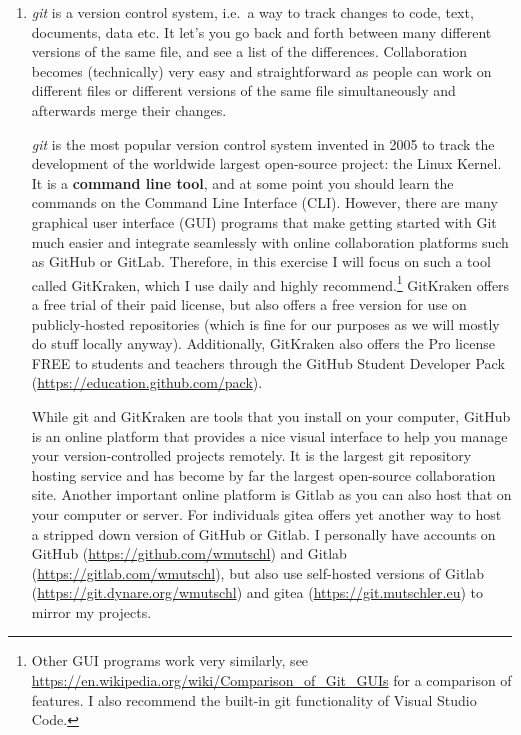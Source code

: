 \begin{enumerate}

\item
\emph{git} is a version control system, i.e.\ a way to track changes to code, text, documents, data etc.
It let's you go back and forth between many different versions of the same file, and see a list of the differences.
Collaboration becomes (technically) very easy and straightforward as people can work on different files or different versions of the same file simultaneously
  and afterwards merge their changes.

\emph{git} is the most popular version control system invented in 2005 to track the development of the worldwide largest open-source project: the Linux Kernel.
It is a \textbf{command line tool}, and at some point you should learn the commands on the Command Line Interface (CLI).
However, there are many graphical user interface (GUI) programs that make getting started with Git much easier
  and integrate seamlessly with online collaboration platforms such as GitHub or GitLab.
Therefore, in this exercise I will focus on such a tool called GitKraken,
  which I use daily and highly recommend.\footnote{%
  Other GUI programs work very similarly,
    see \url{https://en.wikipedia.org/wiki/Comparison_of_Git_GUIs} for a comparison of features.
  I also recommend the built-in git functionality of Visual Studio Code.
}
GitKraken offers a free trial of their paid license,
  but also offers a free version for use on publicly-hosted repositories (which is fine for our purposes as we will mostly do stuff locally anyway).
Additionally, GitKraken also offers the Pro license FREE to students and teachers through the GitHub Student Developer Pack (\url{https://education.github.com/pack}).

While git and GitKraken are tools that you install on your computer,
  GitHub is an online platform that provides a nice visual interface to help you manage your version-controlled projects remotely.
It is the largest git repository hosting service and has become by far the largest open-source collaboration site.
Another important online platform is Gitlab as you can also host that on your computer or server.
For individuals gitea offers yet another way to host a stripped down version of GitHub or Gitlab.	
I personally have accounts on GitHub (\url{https://github.com/wmutschl}) and Gitlab (\url{https://gitlab.com/wmutschl}),
  but also use self-hosted versions of Gitlab (\url{https://git.dynare.org/wmutschl}) and gitea (\url{https://git.mutschler.eu}) to mirror my projects.


\end{enumerate}
